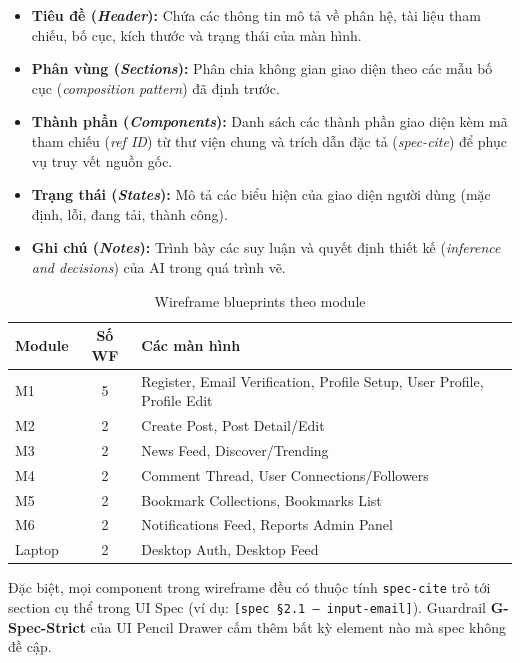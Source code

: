 \documentclass[13pt,a4paper,oneside]{extreport}
\numberwithin{equation}{chapter}
\numberwithin{figure}{chapter}
\numberwithin{table}{chapter}
\begin{document}
\begin{itemize}
    \item \textbf{Tiêu đề (\textit{Header}):} Chứa các thông tin mô tả về phân hệ, tài liệu tham chiếu, bố cục, kích thước và trạng thái của màn hình.
    \item \textbf{Phân vùng (\textit{Sections}):} Phân chia không gian giao diện theo các mẫu bố cục (\textit{composition pattern}) đã định trước.
    \item \textbf{Thành phần (\textit{Components}):} Danh sách các thành phần giao diện kèm mã tham chiếu (\textit{ref ID}) từ thư viện chung và trích dẫn đặc tả (\textit{spec-cite}) để phục vụ truy vết nguồn gốc.
    \item \textbf{Trạng thái (\textit{States}):} Mô tả các biểu hiện của giao diện người dùng (mặc định, lỗi, đang tải, thành công).
    \item \textbf{Ghi chú (\textit{Notes}):} Trình bày các suy luận và quyết định thiết kế (\textit{inference and decisions}) của AI trong quá trình vẽ.
\end{itemize}

\begin{table}[H]
\centering
\caption{Wireframe blueprints theo module}
\label{tab:wireframe-results}
\begin{tabular}{|p{1cm}|c|p{8cm}|}
\hline
\textbf{Module} & \textbf{Số WF} & \textbf{Các màn hình} \\
\hline
M1 & 5 & Register, Email Verification, Profile Setup, User Profile, Profile Edit \\
\hline
M2 & 2 & Create Post, Post Detail/Edit \\
\hline
M3 & 2 & News Feed, Discover/Trending \\
\hline
M4 & 2 & Comment Thread, User Connections/Followers \\
\hline
M5 & 2 & Bookmark Collections, Bookmarks List \\
\hline
M6 & 2 & Notifications Feed, Reports Admin Panel \\
\hline
Laptop & 2 & Desktop Auth, Desktop Feed \\
\hline
\end{tabular}
\end{table}

Đặc biệt, mọi component trong wireframe đều có thuộc tính \texttt{spec-cite} trỏ tới section cụ thể trong UI Spec (ví dụ: \texttt{[spec §2.1 — input-email]}). Guardrail \textbf{G-Spec-Strict} của UI Pencil Drawer cấm thêm bất kỳ element nào mà spec không đề cập.
\end{document}
